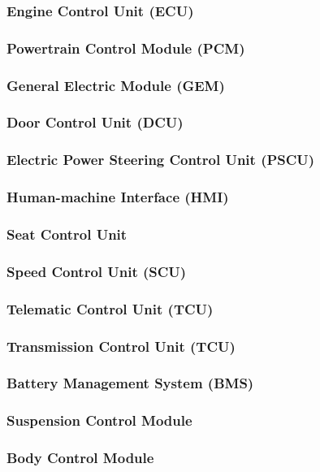         \subsubsection{Engine Control Unit (ECU)}
        \subsubsection{Powertrain Control Module (PCM)}
        \subsubsection{General Electric Module (GEM)}
        \subsubsection{Door Control Unit (DCU)}
        \subsubsection{Electric Power Steering Control Unit (PSCU)}
        \subsubsection{Human-machine Interface (HMI)}
        \subsubsection{Seat Control Unit}
        \subsubsection{Speed Control Unit (SCU)}
        \subsubsection{Telematic Control Unit (TCU)}
        \subsubsection{Transmission Control Unit (TCU)}
        \subsubsection{Battery Management System (BMS)}
        \subsubsection{Suspension Control Module}
        \subsubsection{Body Control Module}